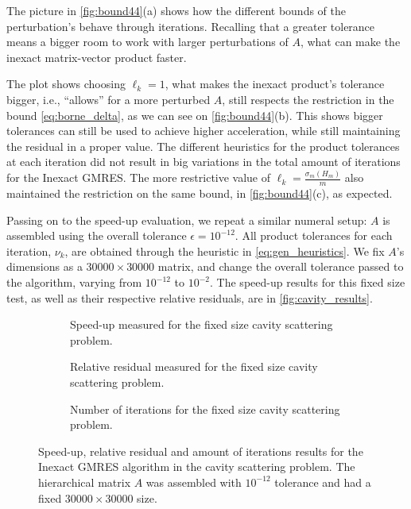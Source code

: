 The picture in \autoref{fig:bound44}(a) shows how the different bounds of the perturbation's behave through iterations. Recalling that a greater tolerance means a bigger room to work with larger perturbations of $A$, what can make the inexact matrix-vector product faster.

The plot shows choosing $\ell_{k} = 1$, what makes the inexact product's tolerance bigger, i.e., “allows” for a more perturbed $A$, still respects the restriction in the bound \ref{eq:borne_delta}, as we can see on \autoref{fig:bound44}(b). This shows bigger tolerances can still be used to achieve higher acceleration, while still maintaining the residual in a proper value. The different heuristics for the product tolerances at each iteration did not result in big variations in the total amount of iterations for the Inexact GMRES. The more restrictive value of $\ell_{k}=\frac{\sigma_{m}(H_{m})}{m}$ also maintained the restriction on the same bound, in \autoref{fig:bound44}(c), as expected.

Passing on to the speed-up evaluation, we repeat a similar numeral setup: $A$ is assembled using the overall tolerance $\epsilon = 10^{-12}$. All product tolerances for each iteration, $\nu_{k}$, are obtained through the heuristic in \autoref{eq:gen_heuristics}. We fix $A$'s dimensions as a $30000\times 30000$ matrix, and change the overall tolerance passed to the algorithm, varying from $10^{-12}$ to $10^{-2}$. The speed-up results for this fixed size test, as well as their respective relative residuals, are in \autoref{fig:cavity_results}.

\begin{figure}[h!]
    \centering
    \begin{subfigure}[b]{0.6\linewidth}
        
        \caption{Speed-up measured for the fixed size cavity scattering problem.}
    \end{subfigure}
    \begin{subfigure}[b]{0.4\linewidth}
        
        \caption{Relative residual measured for the fixed size cavity scattering problem.}
    \end{subfigure}
    \begin{subfigure}[b]{0.4\linewidth}
        
        \caption{Number of iterations for the fixed size cavity scattering problem.}
    \end{subfigure}
    \caption{Speed-up, relative residual and amount of iterations results for the Inexact GMRES algorithm in the cavity scattering problem. The hierarchical matrix $A$ was assembled with $10^{-12}$ tolerance and had a fixed $30000 \times 30000$ size.}
    \label{fig:cavity_results}
\end{figure}


